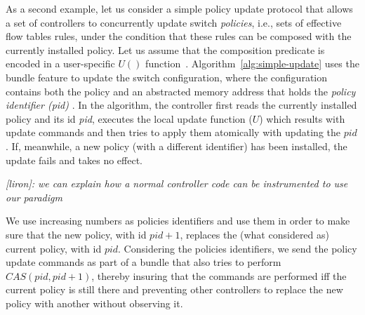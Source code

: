 \documentclass[conference]{sigcomm-alternate}
\newcommand{\ufunc}{U} %
\newcommand{\liron}[1]{\textit{\textcolor{mygreen}{[liron]: #1}}} %
\begin{document}
As a second example, let us consider a simple policy update protocol that
allows a set of  controllers to concurrently update switch  \emph{policies}, i.e., sets of
effective flow tables rules, under the
condition that these rules can be composed with the currently installed
policy.
Let us assume that the composition predicate is encoded in a user-specific
$\textit{\ufunc}()$ function~\cite{cpc}.
Algorithm~\ref{alg:simple-update} uses the bundle feature to update the switch configuration, where the configuration contains both the policy and an abstracted memory address that holds the \emph{policy identifier (pid)} .
In the algorithm, the controller first reads the currently installed
policy and its id \emph{pid}, executes the local update function ($\textit{\ufunc}$) which results with update commands and then tries to apply them atomically with updating the $pid$. If, meanwhile, a new
policy (with a different identifier) has been installed, the update
fails and takes no effect.


\liron{we can explain how a normal controller code can be instrumented to use our paradigm}


We use increasing numbers as policies
identifiers and use them in order to make sure that the new policy, with id
$pid+1$, replaces the (what considered as) current policy, with id
$pid$. Considering the policies identifiers, we send the policy update
commands as part of a bundle that also tries to perform
$CAS(pid,pid+1)$, thereby insuring that the commands are
performed iff the current policy is still there and preventing other
controllers to replace the new policy with another without observing it.

\end{document}
